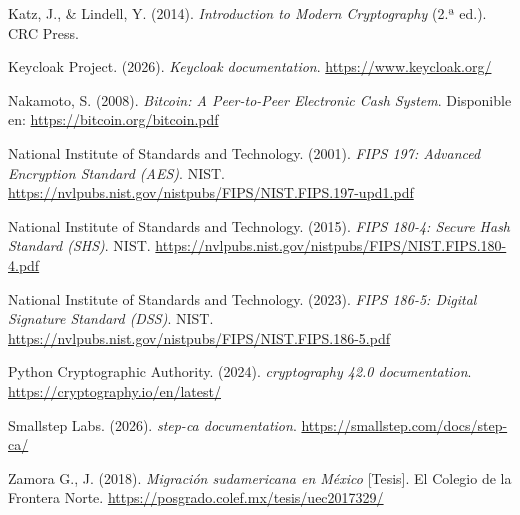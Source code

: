 \documentclass[10pt,letterpaper]{report}
\begin{document}
\begin{description}[leftmargin=0pt, labelwidth=0pt, labelsep=0pt, itemindent=0pt, itemsep=8pt]
    \item[\hypertarget{ref:katz2014}{}]
    Katz, J., \& Lindell, Y. (2014). \textit{Introduction to Modern Cryptography} (2.ª ed.). CRC Press.

    \item[\hypertarget{ref:keycloak2026}{}]
    Keycloak Project. (2026). \textit{Keycloak documentation}. \url{https://www.keycloak.org/}

    \item[\hypertarget{ref:nakamoto2008}{}]
    Nakamoto, S. (2008). \textit{Bitcoin: A Peer-to-Peer Electronic Cash System}. Disponible en: \url{https://bitcoin.org/bitcoin.pdf}

    \item[\hypertarget{ref:nist2001aes}{}]
    National Institute of Standards and Technology. (2001). \textit{FIPS 197: Advanced Encryption Standard (AES)}. NIST. \url{https://nvlpubs.nist.gov/nistpubs/FIPS/NIST.FIPS.197-upd1.pdf}

    \item[\hypertarget{ref:nist2015sha}{}]
    National Institute of Standards and Technology. (2015). \textit{FIPS 180-4: Secure Hash Standard (SHS)}. NIST. \url{https://nvlpubs.nist.gov/nistpubs/FIPS/NIST.FIPS.180-4.pdf}

    \item[\hypertarget{ref:nist2023}{}]
    National Institute of Standards and Technology. (2023). \textit{FIPS 186-5: Digital Signature Standard (DSS)}. NIST. \url{https://nvlpubs.nist.gov/nistpubs/FIPS/NIST.FIPS.186-5.pdf}

    \item[\hypertarget{ref:pyca2024}{}]
    Python Cryptographic Authority. (2024). \textit{cryptography 42.0 documentation}. \url{https://cryptography.io/en/latest/}

    \item[\hypertarget{ref:smallstep2026}{}]
    Smallstep Labs. (2026). \textit{step-ca documentation}. \url{https://smallstep.com/docs/step-ca/}

    \item[\hypertarget{ref:zamora2018}{}]
    Zamora G., J. (2018). \textit{Migración sudamericana en México} [Tesis]. El Colegio de la Frontera Norte. \url{https://posgrado.colef.mx/tesis/uec2017329/}

\end{description}
\endgroup

\appendix
\end{document}
